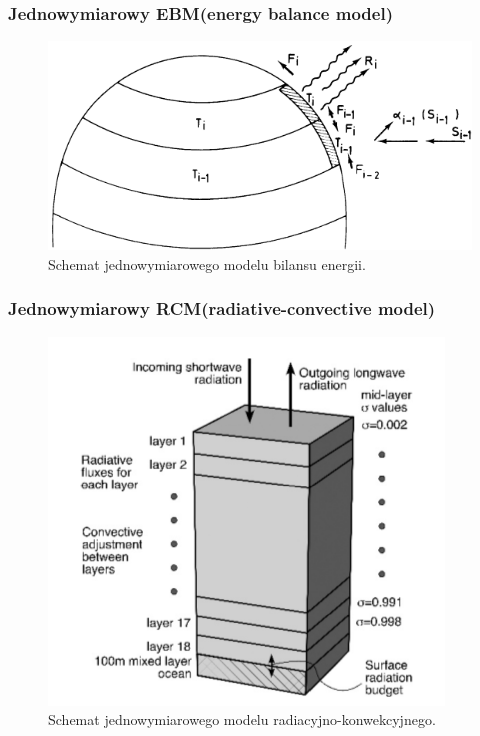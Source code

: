 \documentclass{beamer}
\begin{document}


\begin{frame}
	\frametitle{Jednowymiarowy EBM(energy balance model)}	
	\begin{figure}[h]
		\begin{center}
			\includegraphics[width=0.7\linewidth]{images/1D_EBM.png}
			\caption{Schemat jednowymiarowego modelu bilansu energii.\cite{b3}}
		\end{center}
	\end{figure}
\end{frame}



\begin{frame}
	\frametitle{Jednowymiarowy RCM(radiative-convective model)}	
	\begin{figure}[h]
		\begin{center}
			\includegraphics[width=0.6\linewidth]{images/1D_RC.png}
			\caption{Schemat jednowymiarowego modelu radiacyjno-konwekcyjnego.\cite{b1}}
		\end{center}
	\end{figure}
\end{frame}
\end{document}
